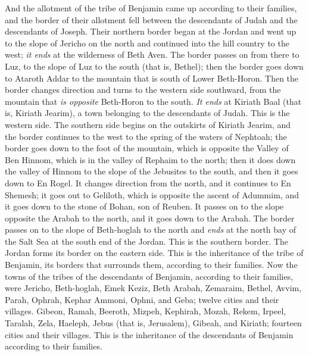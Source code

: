 \begin{biblechapter}
 And the allotment of the tribe of Benjamin came up according to their families, and the border of their allotment fell between the descendants of Judah and the descendants of Joseph.
\verse Their northern border began at the Jordan and went up to the slope of Jericho on the north and continued into the hill country to the west; \textit{it ends} at the wilderness of Beth Aven.
\verse The border passes on from there to Luz, to the slope of Luz to the south (that is, Bethel); then the border goes down to Ataroth Addar to the mountain that is south of Lower Beth-Horon.
\verse Then the border changes direction and turns to the western side southward, from the mountain that \textit{is opposite} Beth-Horon to the south. \textit{It ends} at Kiriath Baal (that is, Kiriath Jearim), a town belonging to the descendants of Judah. This is the western side.
\verse The southern side begins on the outskirts of Kiriath Jearim, and the border continues to the west to the spring of the waters of Nephtoah;
\verse the border goes down to the foot of the mountain, which is opposite the Valley of Ben Hinnom, which is in the valley of Rephaim to the north; then it does down the valley of Hinnom to the slope of the Jebusites to the south, and then it goes down to En Rogel.
\verse It changes direction from the north, and it continues to En Shemesh; it goes out to Geliloth, which is opposite the ascent of Adummim, and it goes down to the stone of Bohan, son of Reuben.
\verse It passes on to the slope opposite the Arabah to the north, and it goes down to the Arabah.
\verse The border passes on to the slope of Beth-hoglah to the north and \textit{ends} at the north bay of the Salt Sea at the south end of the Jordan. This is the southern border.
\verse The Jordan forms its border on the eastern side. This is the inheritance of the tribe of Benjamin, its borders that surrounds them, according to their families.
\verse Now the towns of the tribes of the descendants of Benjamin, according to their families, were Jericho, Beth-hoglah, Emek Keziz,
\verse Beth Arabah, Zemaraim, Bethel,
\verse Avvim, Parah, Ophrah,
\verse Kephar Ammoni, Ophni, and Geba; twelve cities and their villages.
\verse Gibeon, Ramah, Beeroth,
\verse Mizpeh, Kephirah, Mozah,
\verse Rekem, Irpeel, Taralah,
\verse Zela, Haeleph, Jebus (that is, Jerusalem), Gibeah, and Kiriath; fourteen cities and their villages. This is the inheritance of the descendants of Benjamin according to their families.
\end{biblechapter}

